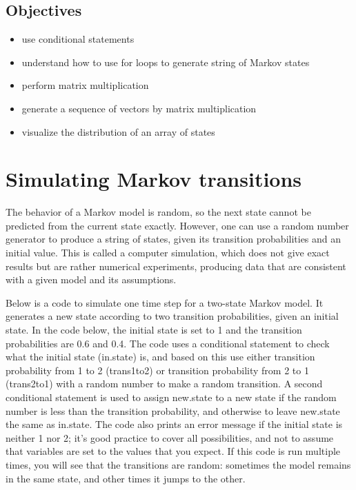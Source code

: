 \documentclass[
  letterpaper,
  DIV=11,
  numbers=noendperiod]{scrreprt}
\providecommand{\tightlist}{%
  \setlength{\itemsep}{0pt}\setlength{\parskip}{0pt}}\usepackage{longtable,booktabs,array}
\begin{document}

\hypertarget{objectives-5}{%
\subsection*{Objectives}\label{objectives-5}}

\begin{itemize}
\tightlist
\item
  use conditional statements
\item
  understand how to use for loops to generate string of Markov states
\item
  perform matrix multiplication
\item
  generate a sequence of vectors by matrix multiplication
\item
  visualize the distribution of an array of states
\end{itemize}

\hypertarget{simulating-markov-transitions}{%
\section*{Simulating Markov
transitions}\label{simulating-markov-transitions}}


The behavior of a Markov model is random, so the next state cannot be
predicted from the current state exactly. However, one can use a random
number generator to produce a string of states, given its transition
probabilities and an initial value. This is called a computer
simulation, which does not give exact results but are rather numerical
experiments, producing data that are consistent with a given model and
its assumptions.

Below is a code to simulate one time step for a two-state Markov model.
It generates a new state according to two transition probabilities,
given an initial state. In the code below, the initial state is set to 1
and the transition probabilities are 0.6 and 0.4. The code uses a
conditional statement to check what the initial state (in.state) is, and
based on this use either transition probability from 1 to 2 (trans1to2)
or transition probability from 2 to 1 (trans2to1) with a random number
to make a random transition. A second conditional statement is used to
assign new.state to a new state if the random number is less than the
transition probability, and otherwise to leave new.state the same as
in.state. The code also prints an error message if the initial state is
neither 1 nor 2; it's good practice to cover all possibilities, and not
to assume that variables are set to the values that you expect. If this
code is run multiple times, you will see that the transitions are
random: sometimes the model remains in the same state, and other times
it jumps to the other.
\end{document}
